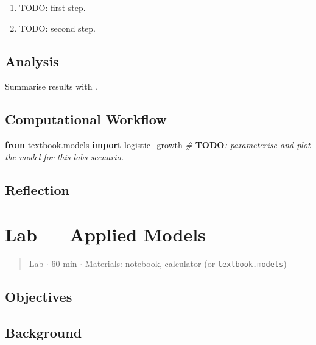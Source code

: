 \documentclass[
]{article}
\newenvironment{Shaded}{}{}
\newcommand{\AlertTok}[1]{\textcolor[rgb]{1.00,0.00,0.00}{\textbf{#1}}}
\newcommand{\CommentTok}[1]{\textcolor[rgb]{0.38,0.63,0.69}{\textit{#1}}}
\newcommand{\ImportTok}[1]{\textcolor[rgb]{0.00,0.50,0.00}{\textbf{#1}}}
\newcommand{\NormalTok}[1]{#1}
\theoremstyle{plain}
\theoremstyle{definition}
\begin{document}
\begin{enumerate}
\def\labelenumi{\arabic{enumi}.}
\item
  TODO: first step.
\item
  TODO: second step.
\end{enumerate}

\subsection{Analysis}\label{analysis-8}

Summarise results with .

\subsection{Computational Workflow}\label{computational-workflow-8}

\begin{Shaded}
\begin{Highlighting}[]
\ImportTok{from}\NormalTok{ textbook.models }\ImportTok{import}\NormalTok{ logistic\_growth}
\CommentTok{\# }\AlertTok{TODO}\CommentTok{: parameterise and plot the model for this lab\textquotesingle{}s scenario.}
\end{Highlighting}
\end{Shaded}

\subsection{Reflection}\label{reflection-8}

\newpage

\section{Lab --- Applied Models}\label{sec:lab_part_III_applied_models}

\begin{quote}
Lab \texorpdfstring{\ensuremath{\cdot}}{.} 60 min \texorpdfstring{\ensuremath{\cdot}}{.} Materials: notebook, calculator (or
\texttt{textbook.models})
\end{quote}

\subsection{Objectives}\label{objectives-9}

\subsection{Background}\label{background-9}
\end{document}
